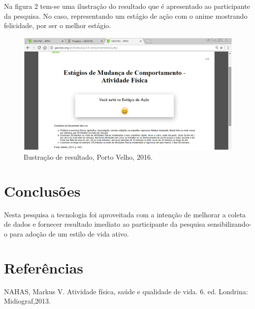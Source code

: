 \documentclass[article,12pt,onesidea,4paper,english,brazil]{abntex2}
\begin{document}
	Na figura 2 tem-se uma ilustração do resultado que é apresentado ao participante da pesquisa. No caso, representando um estágio de ação com o anime mostrando felicidade, por ser o melhor estágio.
	\begin{figure}[h]
		\centering
		\includegraphics[width=0.7\linewidth]{pip-pg75-02}
		\caption{Ilustração de resultado, Porto Velho, 2016.}
		\label{fig:pip-pg75-02}
	\end{figure}
	
	
	\section*{Conclusões}
	
	Nesta pesquisa a tecnologia foi aproveitada com a intenção de melhorar a coleta de dados e fornecer resultado imediato ao participante da pesquisa sensibilizando-o para adoção de um estilo de vida ativo.
	
	
	\section*{Referências}
	
	\noindent NAHAS, Markus V. Atividade física, saúde e qualidade de vida. 6. ed. Londrina: Midiograf,2013.
	
\end{document}
